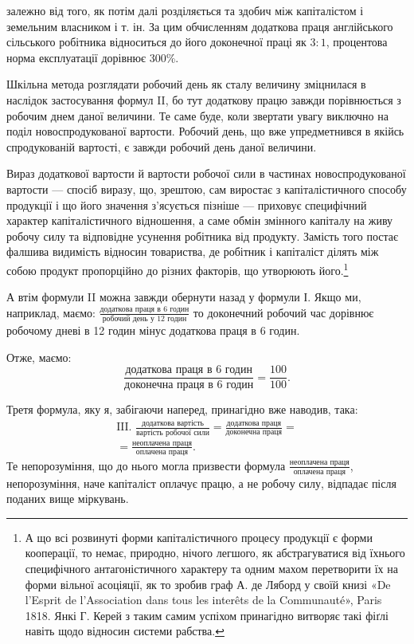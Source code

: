 \parcont{}  %
залежно від того, як потім далі розділяється та здобич між капіталістом
і земельним власником і т. ін. За цим обчисленням
додаткова праця англійського сільського робітника відноситься
до його доконечної праці як $3 : 1$, процентова норма експлуатації
дорівнює 300\%.

Шкільна метода розглядати робочий день як сталу величину
зміцнилася в наслідок застосування формул II, бо тут додаткову
працю завжди порівнюється з робочим днем даної величини.
Те саме буде, коли звертати увагу виключно на поділ новоспродукованої
вартости. Робочий день, що вже упредметнився в якійсь
спродукованій вартості, є завжди робочий день даної величини.

Вираз додаткової вартости й вартости робочої сили в частинах
новоспродукованої вартости — спосіб виразу, що, зрештою,
сам виростає з капіталістичного способу продукції і що його
значення з’ясується пізніше — приховує специфічний характер
капіталістичного відношення, а саме обмін змінного капіталу
на живу робочу силу та відповідне усунення робітника від продукту.
Замість того постає фалшива видимість відносин товариства,
де робітник і капіталіст ділять між собою продукт пропорційно
до різних факторів, що утворюють його.\footnote{
А що всі розвинуті форми капіталістичного процесу продукції
є форми кооперації, то немає, природно, нічого легшого, як абстрагуватися
від їхнього специфічного антагоністичного характеру та одним
махом перетворити їх на форми вільної асоціяції, як то зробив граф
А. де Ляборд у своїй книзі «De l’Esprit de l’Association dans tous les
interêts de la Communauté», Paris 1818. Янкі Г. Керей з таким самим
успіхом принагідно витворяє такі фіґлі навіть щодо відносин системи
рабства.
}

А втім формули II можна завжди обернути назад у формули І.
Якщо ми, наприклад, маємо: $\frac{\text{додаткова праця в 6 годин}}{\text{робочий день у 12 годин}}$
то доконечний робочий час дорівнює робочому дневі в 12 годин мінус
додаткова праця в 6 годин.

Отже, маємо:\[
\frac{\text{додаткова праця в 6 годин}}{\text{доконечна праця в 6 годин}} = \frac{100}{100}\text{.}
\]

Третя формула, яку я, забігаючи наперед, принагідно вже
наводив, така:
\begin{gather*}
\text{III. }
\frac{\text{додаткова вартість}}{\text{вартість робочої сили}} =
\frac{\text{додаткова праця}}{\text{доконечна праця}} = \\
= \frac{\text{неоплачена праця}}{\text{оплачена праця}}
\text{.}
\end{gather*}
Те непорозуміння, що до нього могла призвести формула
$\frac{\text{неоплачена праця}}{\text{оплачена праця}}$, непорозуміння, наче капіталіст оплачує працю,
а не робочу силу, відпадає після поданих вище міркувань.
\parbreak{}  %
